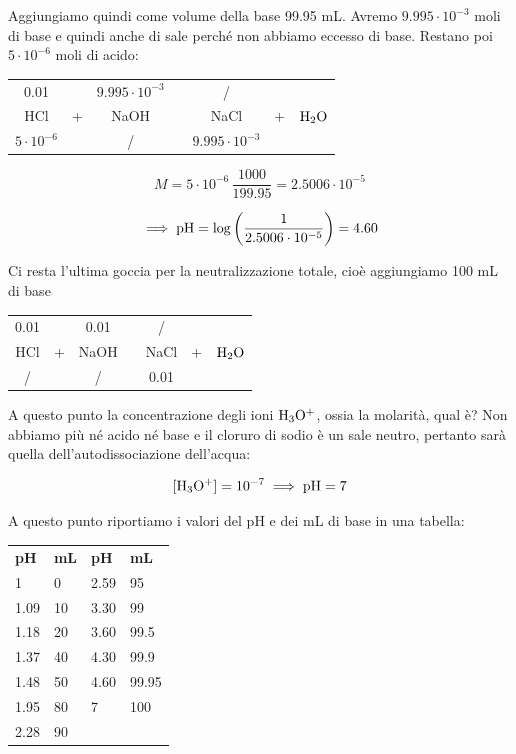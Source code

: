 Aggiungiamo quindi come volume della base 99.95 mL. Avremo $9.995 \cdot 10^{-3}$ moli di base e quindi anche di sale perché non abbiamo eccesso di base. Restano poi $5 \cdot 10^{-6}$ moli di acido:

\begin{center}
    \begin{tabular}{ccccccc}
        0.01 &  & $9.995 \cdot 10^{-3}$  & & / & &\\
        HCl & + & NaOH & \ce{->} & NaCl & + & $\rm H_2O$\\
        $5 \cdot 10^{-6}$ &  &  / & & $9.995 \cdot 10^{-3}$ & &\\
    \end{tabular}
\end{center}

$$M=5 \cdot 10^{-6} \, \frac{1000}{199.95}=2.5006 \cdot 10^{-5}$$

$$\implies \rm pH=\log \left( \frac{1}{2.5006 \cdot 10^{-5}} \right)=4.60$$

Ci resta l'ultima goccia per la neutralizzazione totale, cioè aggiungiamo 100 mL di base

\begin{center}
    \begin{tabular}{ccccccc}
        0.01 &  & 0.01  & & / & &\\
        HCl & + & NaOH & \ce{->} & NaCl & + & $\rm H_2O$\\
        / &  & / & & 0.01 & &\\
    \end{tabular}
\end{center}

A questo punto la concentrazione degli ioni $\rm H_3O^+$, ossia la molarità, qual è? Non abbiamo più né acido né base e il cloruro di sodio è un sale neutro, pertanto sarà quella dell'autodissociazione dell'acqua:

$$\rm [H_3O^+]=10^{-7} \implies pH=7$$

A questo punto riportiamo i valori del pH e dei mL di base in una tabella:

\begin{center}
    \begin{tabular}{|p{1.5cm}|p{1.5cm}||p{1.5cm}|p{1.5cm}|}
        \textbf{pH} & \textbf{mL} & \textbf{pH} & \textbf{mL}\\
        1 & 0 & 2.59 & 95\\
        1.09 & 10 & 3.30 & 99\\
        1.18 & 20 & 3.60 & 99.5\\
        1.37 & 40 & 4.30 & 99.9\\
        1.48 & 50 & 4.60 & 99.95\\
        1.95 & 80 & 7 & 100\\
        2.28 & 90 &&\\
    \end{tabular}
\end{center}

